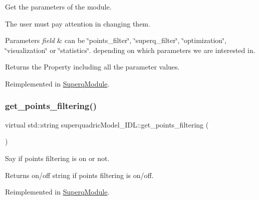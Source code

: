 Get the parameters of the module. 

The user must pay attention in changing them. 
\begin{DoxyParams}{Parameters}
{\em field} & can be \char`\"{}points\+\_\+filter\char`\"{}, \char`\"{}superq\+\_\+filter\char`\"{}, \char`\"{}optimization\char`\"{}, \char`\"{}visualization\char`\"{} or \char`\"{}statistics\char`\"{}. depending on which parameters we are interested in. \\
\hline
\end{DoxyParams}
\begin{DoxyReturn}{Returns}
the Property including all the parameter values. 
\end{DoxyReturn}


Reimplemented in \mbox{\hyperlink{classSuperqModule_a18822e0a99dc0b13479f20960c577fb9}{Superq\+Module}}.

\mbox{\label{classsuperquadricModel__IDL_aa490ebcf39414aaaae41d5095267abb9}} 
\subsubsection{\texorpdfstring{get\+\_\+points\+\_\+filtering()}{get\_points\_filtering()}}
{\footnotesize\ttfamily virtual std\+::string superquadric\+Model\+\_\+\+I\+D\+L\+::get\+\_\+points\+\_\+filtering (\begin{DoxyParamCaption}{ }\end{DoxyParamCaption})\hspace{0.3cm}{\ttfamily [virtual]}}



Say if points filtering is on or not. 

\begin{DoxyReturn}{Returns}
on/off string if points filtering is on/off. 
\end{DoxyReturn}


Reimplemented in \mbox{\hyperlink{classSuperqModule_a60c8ff17436cc55a3e9b704dd6c2529b}{Superq\+Module}}.

\mbox{\label{classsuperquadricModel__IDL_a4b101fe118a1ee912468562bde0b0df4}} 
